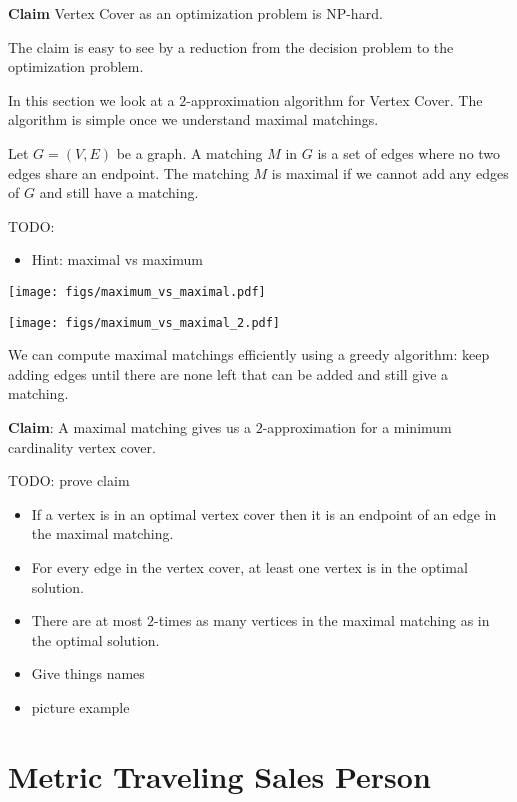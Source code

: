 \textbf{Claim} Vertex Cover as an optimization problem is NP-hard.

The claim is easy to see by a reduction from the decision problem to the optimization problem.

In this section we look at a $2$-approximation algorithm for Vertex Cover.
The algorithm is simple once we understand maximal matchings.

Let $G = (V,E)$ be a graph.
A matching $M$ in $G$ is a set of edges where no two edges share an endpoint.
The matching $M$ is maximal if we cannot add any edges of $G$ and still have a matching.

TODO:
\begin{itemize}
\item Hint: maximal vs maximum
\end{itemize}

\texttt{[image: figs/maximum\_vs\_maximal.pdf]}

\texttt{[image: figs/maximum\_vs\_maximal\_2.pdf]}


We can compute maximal matchings efficiently using a greedy algorithm: keep adding edges until there are none left that can be added and still give a matching.

\textbf{Claim}: A maximal matching gives us a $2$-approximation for a minimum cardinality vertex cover.

TODO: prove claim
\begin{itemize}
\item If a vertex is in an optimal vertex cover then it is an endpoint of an edge in the maximal matching.
\item For every edge in the vertex cover, at least one vertex is in the optimal solution.
\item There are at most $2$-times as many vertices in the maximal matching as in the optimal solution.
\item Give things names
\item picture example
\end{itemize}

\section{Metric Traveling Sales Person}

